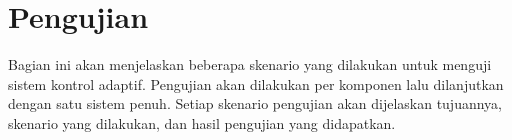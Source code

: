\section{Pengujian}

Bagian ini akan menjelaskan beberapa skenario yang dilakukan untuk menguji sistem kontrol adaptif. Pengujian akan dilakukan per komponen lalu dilanjutkan dengan satu sistem penuh. Setiap skenario pengujian akan dijelaskan tujuannya, skenario yang dilakukan, dan hasil pengujian yang didapatkan.




